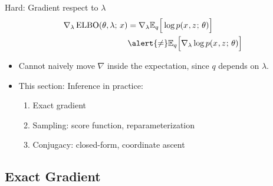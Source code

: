\begin{frame}
Hard: Gradient respect to $\lambda$ 
\begin{align*}
\nabla_{\lambda} \ELBO(\theta, \lambda \param x) &=  \nabla_\lambda \E_{ q}\Big[ \log p(x^{}, z^{} \param \theta) \Big] \\
&\alert{\ne} \E_{q}\Big[\nabla_{\lambda} \log p(x^{}, z^{} \param \theta) \Big] 
\end{align*}

\begin{itemize}
    \item Cannot naively move $\nabla$ inside the expectation, since  $q$ depends on $\lambda$. \pause
    \item This section: Inference in practice:
        \begin{enumerate}
        \item Exact gradient 
        \item Sampling: score function, reparameterization
        \item Conjugacy: closed-form, coordinate ascent
    \end{enumerate}

\end{itemize}
\end{frame}


 

\subsection{Exact Gradient}

